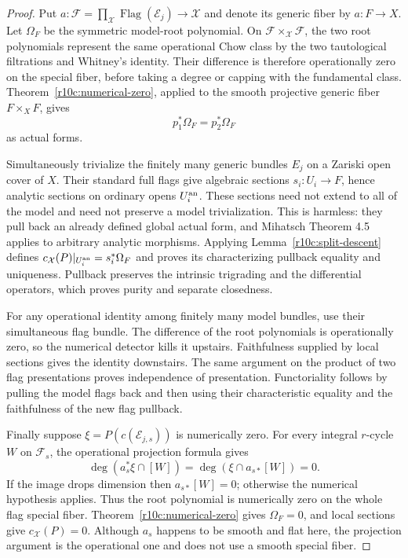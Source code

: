 \documentclass[11pt]{article}
\theoremstyle{definition}
\theoremstyle{remark}
\numberwithin{equation}{section}
\begin{document}
\begin{proof}
Put $a:\mathcal F=\prod_{\mathcal X}\operatorname{Flag}(\mathcal E_j)
\to\mathcal X$ and denote its generic fiber by $a:F\to X$.
Let $\Omega_F$ be the symmetric model-root polynomial.  On
$\mathcal F\times_{\mathcal X}\mathcal F$, the two root polynomials
represent the same operational Chow class by the two tautological
filtrations and Whitney's identity.  Their difference is therefore
operationally zero on the special fiber, before taking a degree or
capping with the fundamental class.  Theorem~\ref{r10c:numerical-zero},
applied to the smooth projective generic fiber $F\times_XF$, gives
\[
                         p_1^*\Omega_F=p_2^*\Omega_F
\]
as actual forms.

Simultaneously trivialize the finitely many generic bundles $E_j$ on
a Zariski open cover of $X$.  Their standard full flags give algebraic
sections $s_i:U_i\to F$, hence analytic sections on ordinary opens
$U_i^{\rm an}$.  These sections need not extend to all of the model
and need not preserve a model trivialization.  This is harmless:
they pull back an already defined global actual form, and Mihatsch
Theorem 4.5 applies to arbitrary analytic morphisms.  Applying
Lemma~\ref{r10c:split-descent} defines
$c_{\mathcal X}(P)|_{U_i^{\rm an}}=s_i^*\Omega_F$ and proves its
characterizing pullback equality and uniqueness.  Pullback preserves
the intrinsic trigrading and the differential operators, which proves
purity and separate closedness.

For any operational identity among finitely many model bundles, use
their simultaneous flag bundle.  The difference of the root polynomials
is operationally zero, so the numerical detector kills it upstairs.
Faithfulness supplied by local sections gives the identity downstairs.
The same argument on the product of two flag presentations proves
independence of presentation.  Functoriality follows by pulling the
model flags back and then using their characteristic equality and the
faithfulness of the new flag pullback.

Finally suppose $\xi=P(c(\mathcal E_{j,s}))$ is numerically zero.
For every integral $r$-cycle $W$ on $\mathcal F_s$, the operational
projection formula gives
\[
                 \deg(a_s^*\xi\cap[W])=
                 \deg(\xi\cap a_{s*}[W])=0.
\]
If the image drops dimension then $a_{s*}[W]=0$; otherwise the numerical
hypothesis applies.  Thus the root polynomial is numerically zero on
the whole flag special fiber.  Theorem~\ref{r10c:numerical-zero}
gives $\Omega_F=0$, and local sections give $c_{\mathcal X}(P)=0$.
Although $a_s$ happens to be smooth and flat here, the projection
argument is the operational one and does not use a smooth special fiber.
\end{proof}
\end{document}
